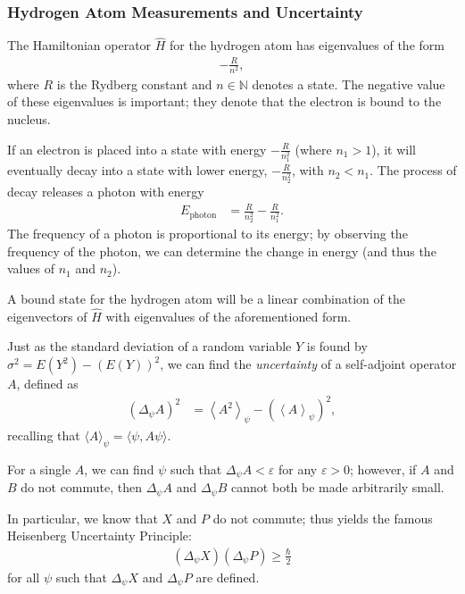 \documentclass[12pt]{extarticle}
\newcommand{\N}{\mathbb{N}}
\theoremstyle{plain}
\theoremstyle{definition}
\theoremstyle{remark}
\renewcommand{\newline}{\hfill\break}
\begin{document}
  \subsubsection{Hydrogen Atom Measurements and Uncertainty}%
  The Hamiltonian operator $\hat{H}$ for the hydrogen atom has eigenvalues of the form
  \begin{align*}
    -\frac{R}{n^2},
  \end{align*}
  where $R$ is the Rydberg constant and $n\in \N$ denotes a state. The negative value of these eigenvalues is important; they denote that the electron is bound to the nucleus.\newline

  If an electron is placed into a state with energy $-\frac{R}{n_1^2}$ (where $n_1 > 1$), it will eventually decay into a state with lower energy, $-\frac{R}{n_2^2}$, with $n_2 < n_1$. The process of decay releases a photon with energy
  \begin{align*}
    E_{\text{photon}} &= \frac{R}{n_2^2} - \frac{R}{n_1^2}.
  \end{align*}
  The frequency of a photon is proportional to its energy; by observing the frequency of the photon, we can determine the change in energy (and thus the values of $n_1$ and $n_2$).\newline

  A bound state for the hydrogen atom will be a linear combination of the eigenvectors of $\hat{H}$ with eigenvalues of the aforementioned form.\newline

  Just as the standard deviation of a random variable $Y$ is found by $\sigma^2 = E(Y^2) - \left(E(Y)\right)^2$, we can find the \textit{uncertainty} of a self-adjoint operator $A$, defined as
  \begin{align*}
    \left(\Delta_{\psi}A\right)^2 &= \left\langle A^2\right\rangle_{\psi} - \left(\left\langle A\right\rangle_{\psi}\right)^2,
  \end{align*}
  recalling that $\langle A \rangle_{\psi} = \langle \psi,A\psi\rangle$.\newline

  For a single $A$, we can find $\psi$ such that $\Delta_{\psi}A < \varepsilon$ for any $\varepsilon > 0$; however, if $A$ and $B$ do not commute, then $\Delta_{\psi}A$ and $\Delta_{\psi}B$ cannot both be made arbitrarily small.\newline

  In particular, we know that $X$ and $P$ do not commute; thus yields the famous Heisenberg Uncertainty Principle:
  \begin{align*}
    \left(\Delta_{\psi}X\right)\left(\Delta_{\psi}P\right) \geq \frac{\hbar}{2}
  \end{align*}
  for all $\psi$ such that $\Delta_{\psi}X$ and $\Delta_{\psi}P$ are defined.
\end{document}
